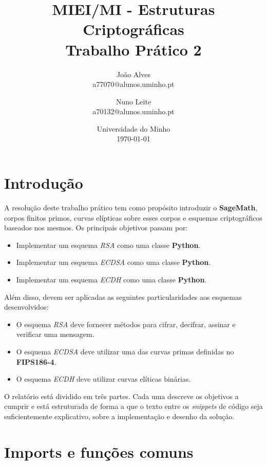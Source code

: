 \documentclass[11pt]{article}
\title{MIEI/MI - Estruturas Criptográficas\\
            \large Trabalho Prático 2}
\author{
        João Alves \\
        a77070@alunos.uminho.pt
        \and
        Nuno Leite \\
        a70132@alunos.uminho.pt
    }
\date{
        Universidade do Minho\\
        \today
    }
\providecommand{\tightlist}{%
      \setlength{\itemsep}{0pt}\setlength{\parskip}{0pt}}
\begin{document}
    
    
    \maketitle
    
    

    \section{Introdução}\label{introduuxe7uxe3o}

    A resolução deste trabalho prático tem como propósito introduzir o
\textbf{SageMath}, corpos finitos primos, curvas elípticas sobre esses
corpos e esquemas criptográficos baseados nos mesmos. Os principais
objetivos passam por:

\begin{itemize}
\tightlist
\item
  Implementar um esquema \emph{RSA} como uma classe \textbf{Python}.
\item
  Implementar um esquema \emph{ECDSA} como uma classe \textbf{Python}.
\item
  Implementar um esquema \emph{ECDH} como uma classe \textbf{Python}.
\end{itemize}

Além disso, devem ser aplicadas as seguintes particularidades aos
esquemas desenvolvidos:

\begin{itemize}
\tightlist
\item
  O esquema \emph{RSA} deve fornecer métodos para cifrar, decifrar,
  assinar e verificar uma mensagem.
\item
  O esquema \emph{ECDSA} deve utilizar uma das curvas primas definidas
  no \textbf{FIPS186-4}.
\item
  O esquema \emph{ECDH} deve utilizar curvas elíticas binárias.
\end{itemize}

O relatório está dividido em três partes. Cada uma descreve os objetivos
a cumprir e está estruturada de forma a que o texto entre os
\emph{snippets} de código seja suficientemente explicativo, sobre a
implementação e desenho da solução.

    \section{Imports e funções
comuns}\label{imports-e-funuxe7uxf5es-comuns}
\end{document}
